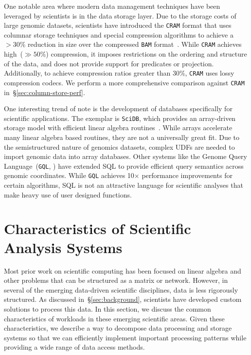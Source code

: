 \documentclass{acm_proc_article-sp}
\begin{document}
One notable area where modern data management techniques have been leveraged by scientists is in
the data storage layer. Due to the storage costs of large genomic datasets, scientists have introduced the
\texttt{CRAM} format that uses columnar storage techniques and special compression algorithms to achieve a
$>30$\% reduction in size over the compressed \texttt{BAM} format~\cite{fritz11}. While \texttt{CRAM} achieves
high~($\gg 50\%$) compression, it imposes restrictions on the ordering and structure of the data, and does not provide
support for predicates or projection. Additionally, to achieve compression ratios greater than 30\%, \texttt{CRAM} uses
lossy compression codecs. We perform a more comprehensive comparison against \texttt{CRAM}
in~\S\ref{sec:column-store-perf}.

One interesting trend of note is the development of databases specifically for scientific applications.
The exemplar is \linebreak \texttt{SciDB}, which provides an array-driven storage model with efficient
linear algebra routines~\cite{brown10}. While arrays accelerate many linear algebra based routines, they
are not a universally great fit. Due to the semistructured nature of genomics datasets, complex UDFs are needed
to import genomic data into array databases. Other systems like the Genome Query Language~(\texttt{GQL},
\cite{kozanitis14}) have extended SQL to provide efficient query semantics across
genomic coordinates. While \texttt{GQL} achieves 10$\times$ performance improvements for certain
algorithms, SQL is not an attractive language for scientific analyses that make heavy use of user designed functions.

\section{Characteristics of Scientific \\ Analysis Systems}
\label{sec:principles}

Most prior work on scientific computing has been focused on linear algebra and other problems that can
be structured as a matrix or network. However, in several of the emerging data-driven scientific
disciplines, data is less rigorously structured. As discussed in~\S\ref{sec:background}, scientists have
developed custom solutions to process this data. In this
section, we discuss the common characteristics of workloads in these emerging scientific areas. Given
these characteristics, we describe a way to decompose data processing and storage systems so that
we can efficiently implement important processing patterns while providing a wide range of data access
methods.
\end{document}
